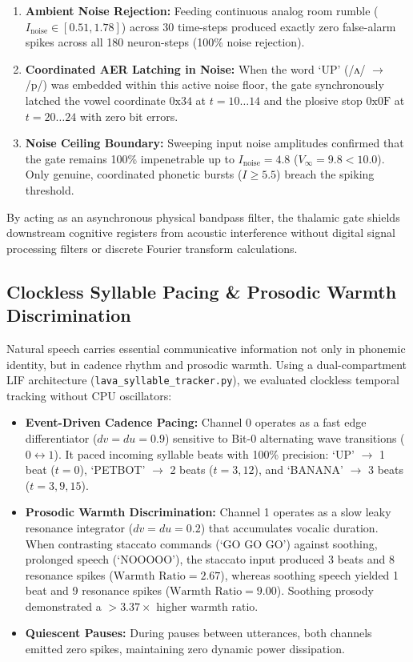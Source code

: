 \documentclass[journal,twocolumn]{IEEEtran}
\begin{document}
\begin{enumerate}
    \item \textbf{Ambient Noise Rejection:} Feeding continuous analog room rumble ($I_{\text{noise}} \in [0.51, 1.78]$) across 30 time-steps produced exactly zero false-alarm spikes across all 180 neuron-steps (100\% noise rejection).
    \item \textbf{Coordinated AER Latching in Noise:} When the word `UP' (/ʌ/ $\to$ /p/) was embedded within this active noise floor, the gate synchronously latched the vowel coordinate $0\text{x}34$ at $t = 10 \dots 14$ and the plosive stop $0\text{x}0\text{F}$ at $t = 20 \dots 24$ with zero bit errors.
    \item \textbf{Noise Ceiling Boundary:} Sweeping input noise amplitudes confirmed that the gate remains 100\% impenetrable up to $I_{\text{noise}} = 4.8$ ($V_\infty = 9.8 < 10.0$). Only genuine, coordinated phonetic bursts ($I \ge 5.5$) breach the spiking threshold.
\end{enumerate}

By acting as an asynchronous physical bandpass filter, the thalamic gate shields downstream cognitive registers from acoustic interference without digital signal processing filters or discrete Fourier transform calculations.

\subsection{Clockless Syllable Pacing \& Prosodic Warmth Discrimination}
Natural speech carries essential communicative information not only in phonemic identity, but in cadence rhythm and prosodic warmth. Using a dual-compartment LIF architecture (\texttt{lava\_syllable\_tracker.py}), we evaluated clockless temporal tracking without CPU oscillators:
\begin{itemize}
    \item \textbf{Event-Driven Cadence Pacing:} Channel 0 operates as a fast edge differentiator ($dv = du = 0.9$) sensitive to Bit-0 alternating wave transitions ($0 \leftrightarrow 1$). It paced incoming syllable beats with 100\% precision: `UP' $\to$ 1 beat ($t=0$), `PETBOT' $\to$ 2 beats ($t=3, 12$), and `BANANA' $\to$ 3 beats ($t=3, 9, 15$).
    \item \textbf{Prosodic Warmth Discrimination:} Channel 1 operates as a slow leaky resonance integrator ($dv = du = 0.2$) that accumulates vocalic duration. When contrasting staccato commands (`GO GO GO') against soothing, prolonged speech (`NOOOOO'), the staccato input produced 3 beats and 8 resonance spikes ($\text{Warmth Ratio} = 2.67$), whereas soothing speech yielded 1 beat and 9 resonance spikes ($\text{Warmth Ratio} = 9.00$). Soothing prosody demonstrated a $>3.37\times$ higher warmth ratio.
    \item \textbf{Quiescent Pauses:} During pauses between utterances, both channels emitted zero spikes, maintaining zero dynamic power dissipation.
\end{itemize}
\end{document}
